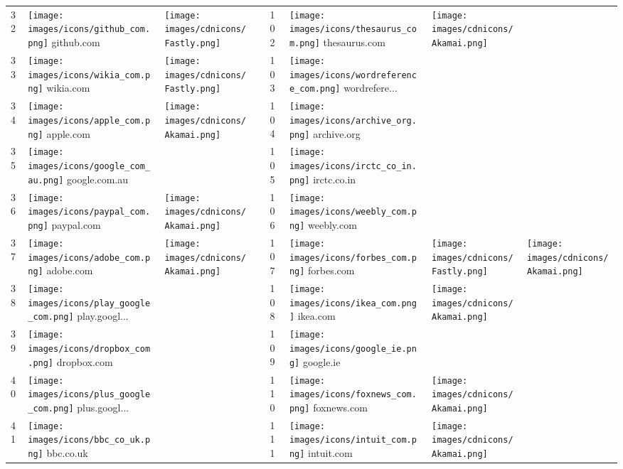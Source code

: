 \begin{table}[tbp]
\begin{tabular}{|llll|llll|}
32 & \texttt{[image: images/icons/github\_com.png]} github.com & \texttt{[image: images/cdnicons/Fastly.png]} & & 102 & \texttt{[image: images/icons/thesaurus\_com.png]} thesaurus.com & \texttt{[image: images/cdnicons/Akamai.png]} & \\
33 & \texttt{[image: images/icons/wikia\_com.png]} wikia.com & \texttt{[image: images/cdnicons/Fastly.png]} & & 103 & \texttt{[image: images/icons/wordreference\_com.png]} wordrefere... & & \\
34 & \texttt{[image: images/icons/apple\_com.png]} apple.com & \texttt{[image: images/cdnicons/Akamai.png]} & & 104 & \texttt{[image: images/icons/archive\_org.png]} archive.org & & \\
35 & \texttt{[image: images/icons/google\_com\_au.png]} google.com.au & & & 105 & \texttt{[image: images/icons/irctc\_co\_in.png]} irctc.co.in & & \\
36 & \texttt{[image: images/icons/paypal\_com.png]} paypal.com & \texttt{[image: images/cdnicons/Akamai.png]} & & 106 & \texttt{[image: images/icons/weebly\_com.png]} weebly.com & & \\
37 & \texttt{[image: images/icons/adobe\_com.png]} adobe.com & \texttt{[image: images/cdnicons/Akamai.png]} & & 107 & \texttt{[image: images/icons/forbes\_com.png]} forbes.com & \texttt{[image: images/cdnicons/Fastly.png]} & \texttt{[image: images/cdnicons/Akamai.png]} \\
38 & \texttt{[image: images/icons/play\_google\_com.png]} play.googl... & & & 108 & \texttt{[image: images/icons/ikea\_com.png]} ikea.com & \texttt{[image: images/cdnicons/Akamai.png]} & \\
39 & \texttt{[image: images/icons/dropbox\_com.png]} dropbox.com & & & 109 & \texttt{[image: images/icons/google\_ie.png]} google.ie & & \\
40 & \texttt{[image: images/icons/plus\_google\_com.png]} plus.googl... & & & 110 & \texttt{[image: images/icons/foxnews\_com.png]} foxnews.com & \texttt{[image: images/cdnicons/Akamai.png]} & \\
41 & \texttt{[image: images/icons/bbc\_co\_uk.png]} bbc.co.uk & & & 111 & \texttt{[image: images/icons/intuit\_com.png]} intuit.com & \texttt{[image: images/cdnicons/Akamai.png]} & \\

\end{tabular}
\end{table}
